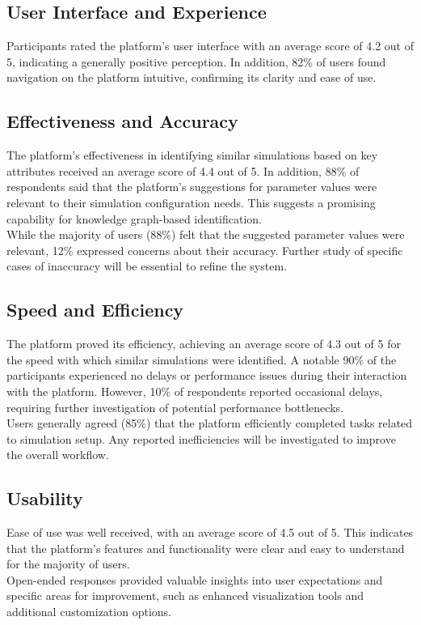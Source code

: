 \subsection{User Interface and Experience}
Participants rated the platform's user interface with an average score of 4.2 out of 5, indicating a generally positive perception. In addition, 82\% of users found navigation on the platform intuitive, confirming its clarity and ease of use.\\


\subsection{Effectiveness and Accuracy}
The platform's effectiveness in identifying similar simulations based on key attributes received an average score of 4.4 out of 5. In addition, 88\% of respondents said that the platform's suggestions for parameter values were relevant to their simulation configuration needs. This suggests a promising capability for knowledge graph-based identification.\\
While the majority of users (88\%) felt that the suggested parameter values were relevant, 12\% expressed concerns about their accuracy. Further study of specific cases of inaccuracy will be essential to refine the system.\\


\subsection{Speed and Efficiency}
The platform proved its efficiency, achieving an average score of 4.3 out of 5 for the speed with which similar simulations were identified. A notable 90\% of the participants experienced no delays or performance issues during their interaction with the platform. However, 10\% of respondents reported occasional delays, requiring further investigation of potential performance bottlenecks.\\
Users generally agreed (85\%) that the platform efficiently completed tasks related to simulation setup. Any reported inefficiencies will be investigated to improve the overall workflow.\\


\subsection{Usability}
Ease of use was well received, with an average score of 4.5 out of 5. This indicates that the platform's features and functionality were clear and easy to understand for the majority of users.\\
Open-ended responses provided valuable insights into user expectations and specific areas for improvement, such as enhanced visualization tools and additional customization options.\\


